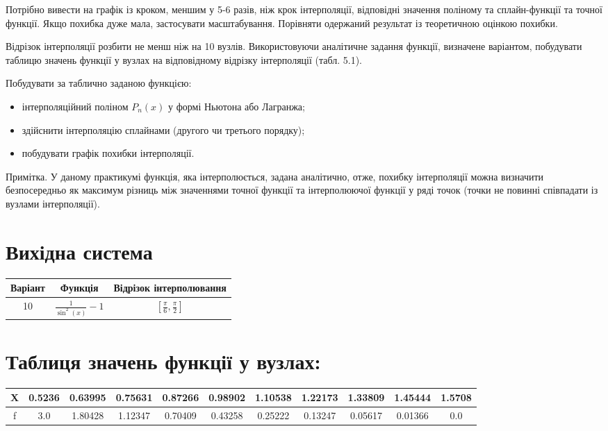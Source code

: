 \documentclass{article}
\begin{document}
    Потрібно вивести на графік із кроком, меншим у 5-6 разів, ніж крок інтерполяції, відповідні значення поліному та сплайн-функції та точної функції.
    Якщо похибка дуже мала, застосувати масштабування.
    Порівняти одержаний результат із теоретичною оцінкою похибки.

    Відрізок інтерполяції розбити не менш ніж на 10 вузлів. Використовуючи аналітичне
    задання функції, визначене варіантом, побудувати таблицю значень функції у вузлах на
    відповідному відрізку інтерполяції (табл. 5.1).

    Побудувати за таблично заданою функцією:

    \begin{itemize}
        \item інтерполяційний поліном $P_n(x)$ у формі Ньютона або Лагранжа;
        \item здійснити інтерполяцію сплайнами (другого чи третього порядку);
        \item побудувати графік похибки інтерполяції.
    \end{itemize}

    Примітка. У даному практикумі функція, яка інтерполюється, задана аналітично, отже, похибку
    інтерполяції можна визначити безпосередньо як максимум різниць між значеннями точної функції
    та інтерполюючої функції у ряді точок (точки не повинні співпадати із вузлами інтерполяції).

    \section{Вихідна система}
    \begin{tabular}{ |c|c|c| }
        \hline
        Варіант & Функція & Відрізок інтерполювання \\ 
        \hline
        10 & $ \frac{1}{\sin^2(x)} - 1 $ & $ [\frac{\pi}{6}, \frac{\pi}{2}] $ \\ 
        \hline
    \end{tabular}

    \section{Таблиця значень функції у вузлах:}
    \begin{tabular}{ |c|c|c|c|c|c|c|c|c|c|c| }
        \hline
        X & 0.5236 & 0.63995 & 0.75631 & 0.87266 & 0.98902 & 1.10538 & 1.22173 & 1.33809 & 1.45444 & 1.5708\\
        \hline
        f & 3.0 & 1.80428 & 1.12347 & 0.70409 & 0.43258 & 0.25222 & 0.13247 & 0.05617 & 0.01366 & 0.0\\
        \hline
    \end{tabular}
\end{document}

